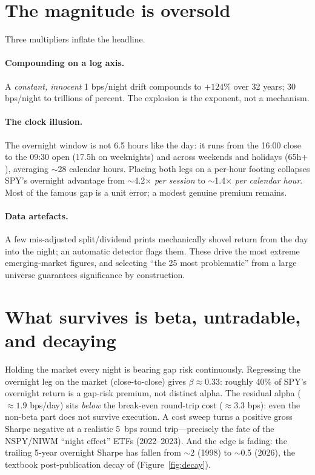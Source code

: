 \documentclass[11pt]{article}
\begin{document}
\section{The magnitude is oversold}
Three multipliers inflate the headline.

\paragraph{Compounding on a log axis.} A \emph{constant, innocent} 1 bps/night
drift compounds to $+124\%$ over 32 years; 30 bps/night to trillions of percent.
The explosion is the exponent, not a mechanism.

\paragraph{The clock illusion.} The overnight window is not 6.5 hours like the
day: it runs from the 16:00 close to the 09:30 open (17.5h on weeknights) and
across weekends and holidays (65h$+$), averaging $\sim$28 calendar hours. Placing
both legs on a per-hour footing collapses SPY's overnight advantage from
$\sim$4.2$\times$ \emph{per session} to $\sim$1.4$\times$ \emph{per calendar
hour}. Most of the famous gap is a unit error; a modest genuine premium remains.

\paragraph{Data artefacts.} A few mis-adjusted split/dividend prints mechanically
shovel return from the day into the night; an automatic detector flags them.
These drive the most extreme emerging-market figures, and selecting ``the 25 most
problematic'' from a large universe guarantees significance by construction.

\section{What survives is beta, untradable, and decaying}
Holding the market every night is bearing gap risk continuously. Regressing the
overnight leg on the market (close-to-close) gives $\beta\approx 0.33$: roughly
40\% of SPY's overnight return is a gap-risk premium, not distinct alpha. The
residual alpha ($\approx 1.9$ bps/day) sits \emph{below} the break-even
round-trip cost ($\approx 3.3$ bps): even the non-beta part does not survive
execution. A cost sweep turns a positive gross Sharpe negative at a realistic
5~bps round trip---precisely the fate of the NSPY/NIWM ``night effect'' ETFs
(2022--2023). And the edge is fading: the trailing 5-year overnight Sharpe has
fallen from $\sim$2 (1998) to $\sim$0.5 (2026), the textbook post-publication
decay of \cite{mclean2016} (Figure~\ref{fig:decay}).
\end{document}
